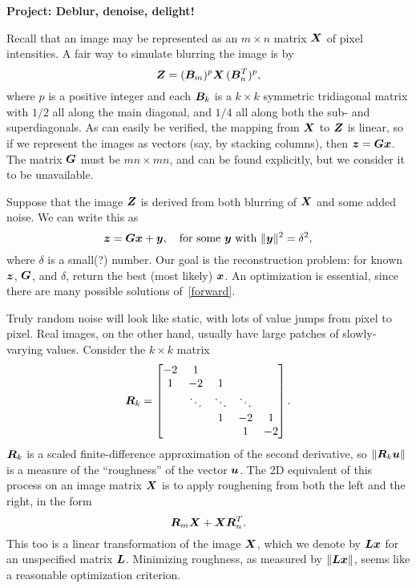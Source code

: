 \documentclass[11pt,letterpaper]{article}
\begin{document}
	
\begin{center}
  \bf 
  Project: Deblur, denoise, delight!
\end{center}
	
Recall that an image may be represented as an $m\times n$ matrix $\bm{X}$ of pixel intensities. A fair way to simulate blurring the image is by
\begin{equation}
\label{blurmat}
\bm{Z} =  (\bm{B}_m)^p \bm{X} \, (\bm{B}_n^T)^p,
\end{equation}
where $p$ is a positive integer and each $\bm{B}_k$ is a $k\times k$ symmetric tridiagonal matrix with $1/2$ all along the main diagonal, and $1/4$ all along both the sub- and superdiagonals. As can easily be verified, the mapping from $\bm{X}$ to $\bm{Z}$ is linear, so if we represent the images as vectors (say, by stacking columns), then $\bm{z}=\bm{G} \bm{x}$. The matrix $\bm{G}$ must be $mn\times mn$, and can be found explicitly, but we consider it to be unavailable. 

Suppose that the image $\bm{Z}$ is derived from both blurring of $\bm{X}$ and some added noise. We can write this as 
\begin{equation}
\label{forward}
\bm{z} = \bm{G} \bm{x} + \bm{y}, \quad \text{for some $\bm{y}$ with $\|\bm{y}\|^2=\delta^2$},
\end{equation}
where $\delta$ is a small(?) number. Our goal is the reconstruction problem: for known $\bm{z}$, $\bm{G}$, and $\delta$, return the best (most likely) $\bm{x}$. An optimization is essential, since there are many possible solutions of~\eqref{forward}. 

Truly random noise will look like static, with lots of value jumps from pixel to pixel. Real images, on the other hand, usually have large patches of slowly-varying values. Consider the $k\times k$ matrix 
\begin{equation}
\bm{R}_k = 
\begin{bmatrix}
  -2 & 1      &        &        &    \\
  1  & -2     & 1      &        &    \\
     & \ddots & \ddots & \ddots &    \\
     &        & 1      & -2     & 1  \\
     &        &        & 1      & -2 \\
\end{bmatrix}.
\end{equation}
$\bm{R}_k$ is a scaled finite-difference approximation of the second derivative, so $\|\bm{R}_k\bm{u}\|$ is a measure of the ``roughness'' of the vector $\bm{u}$. The 2D equivalent of this process on an image matrix $\bm{X}$ is to apply roughening from both the left and the right, in the form 
\begin{equation}
  \label{roughmat}
   \bm{R}_m\bm{X} + \bm{X}\bm{R}_n^T.
\end{equation}
This too is a linear transformation of the image $\bm{X}$, which we denote by $\bm{L}\bm{x}$ for an unspecified matrix $\bm{L}$. Minimizing roughness, as measured by $\|\bm{L}\bm{x}\|$, seems like a reasonable optimization criterion. 
\end{document}
